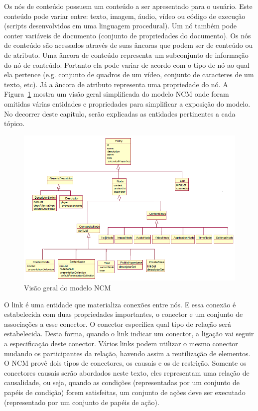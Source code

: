     Os nós de conteúdo possuem um conteúdo a ser apresentado para o usuário. Este conteúdo pode variar entre: texto, imagem, áudio, vídeo ou código de execução (scripts desenvolvidos em uma linguagem procedural). Um nó também pode conter variáveis de documento (conjunto de propriedades do documento). Os nós de conteúdo são acessados através de suas âncoras que podem ser de conteúdo ou de atributo. Uma âncora de conteúdo representa um subconjunto de informação do nó de conteúdo. Portanto ela pode variar de acordo com o tipo de nó ao qual ela pertence (e.g. conjunto de quadros de um vídeo, conjunto de caracteres de um texto, etc). Já a âncora de atributo representa uma propriedade do nó. A Figura~\ref{fig:NCM} mostra um visão geral simplificada do modelo NCM onde foram omitidas várias entidades e propriedades para simplificar a exposição do modelo. No decorrer deste capítulo, serão explicadas as entidades pertinentes a cada tópico.

\begin{figure}[!h]
    \centering
    \includegraphics[scale=0.6,keepaspectratio=true]{figuras/NCM_old.png}
    \caption{Visão geral do modelo NCM \cite{Soares:2005qy}}
    \label{fig:NCM}
\end{figure}

    O link é uma entidade que materializa conexões entre nós. E essa conexão é estabelecida com duas propriedades importantes, o conector e um conjunto de associações a esse conector. O conector especifica qual tipo de relação será estabelecida. Desta forma, quando o link indicar um conector, a ligação vai seguir a especificação deste conector. Vários links podem utilizar o mesmo conector mudando os participantes da relação, havendo assim a reutilização de elementos. O NCM provê dois tipos de conectores, os causais e os de restrição. Somente os conectores causais serão abordados neste texto, eles representam uma relação de  causalidade, ou seja, quando as condições (representadas por um conjunto de papéis de condição) forem satisfeitas, um conjunto de ações deve ser executado (representado por um conjunto de papéis de ação).
    
